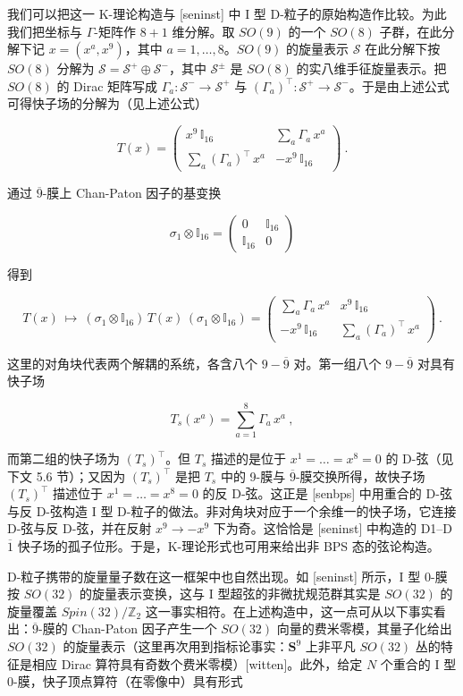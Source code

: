 \documentclass[11pt,a4paper]{ctexart}
\begin{document}
我们可以把这一 K-理论构造与 [seninst] 中 I 型 D-粒子的原始构造作比较。为此我们把坐标与 \(\Gamma\)-矩阵作 \(8+1\) 维分解。取 \(SO(9)\) 的一个 \(SO(8)\) 子群，在此分解下记 \(x=(x^a,x^9)\)，其中 \(a=1,\ldots, 8\)。\(SO(9)\) 的旋量表示 \({\mathcal S}\) 在此分解下按 \(SO(8)\) 分解为 \({\mathcal S}={\mathcal S}^+\oplus {\mathcal S}^-\)，其中 \({\mathcal S}^{\pm}\) 是 \(SO(8)\) 的实八维手征旋量表示。把 \(SO(8)\) 的 Dirac 矩阵写成 \(\Gamma_a: {\mathcal S}^-\rightarrow {\mathcal S}^+\) 与 \((\Gamma_a)^{\top}:{\mathcal S}^+\rightarrow{\mathcal S}^-\)。于是由上述公式可得快子场的分解为（见上述公式）

\[T(x)=\left( \begin{array}{cc}x^9\,{\mathbb{I}}_{16}& \sum_a\Gamma_a\,x^a\\
\sum_a(\Gamma_a)^{\top}\,x^a&-x^9\,{\mathbb{I}}_{16}
\end{array}\right)\ .\]

通过 \(\overline{9}\)-膜上 Chan-Paton 因子的基变换

\[\sigma_1\otimes{\mathbb{I}}_{16}=\left(
\begin{array}{cc}0&{\mathbb{I}}_{16}\\{\mathbb{I}}_{16}&0
\end{array}\right)\]

得到

\[T(x)~\longmapsto~(\sigma_1\otimes{\mathbb{I}}_{16})\,T(x)\,(\sigma_1\otimes{\mathbb{I}}_{16})=
\left( \begin{array}{cc} \sum_a\Gamma_a\,x^a & x^9\,{\mathbb{I}}_{16}\\ -x^9\,{\mathbb{I}}_{16}
&\sum_a(\Gamma_a)^{\top}\,x^a
\end{array}\right)\ .\]

这里的对角块代表两个解耦的系统，各含八个 \(9-\overline{9}\) 对。第一组八个 \(9-\overline{9}\) 对具有快子场

\[T_s(x^a)=\sum_{a=1}^8\Gamma_a\,x^a\ ,\]

而第二组的快子场为 \((T_s)^\top\)。但 \(T_s\) 描述的是位于 \(x^1=\ldots=x^8=0\) 的 D-弦（见下文 5.6 节）；又因为 \((T_s)^\top\) 是把 \(T_s\) 中的 9-膜与 \(\overline{9}\)-膜交换所得，故快子场 \((T_s)^\top\) 描述位于 \(x^1=\ldots=x^8=0\) 的反 D-弦。这正是 [senbps] 中用重合的 D-弦与反 D-弦构造 I 型 D-粒子的做法。非对角块对应于一个余维一的快子场，它连接 D-弦与反 D-弦，并在反射 \(x^9\rightarrow -x^9\) 下为奇。这恰恰是 [seninst] 中构造的 D1--D\(\overline{1}\) 快子场的孤子位形。于是，K-理论形式也可用来给出非 BPS 态的弦论构造。

D-粒子携带的旋量量子数在这一框架中也自然出现。如 [seninst] 所示，I 型 0-膜按 \(SO(32)\) 的旋量表示变换，这与 I 型超弦的非微扰规范群其实是 \(SO(32)\) 的旋量覆盖 \(Spin(32)/{\mathbb{Z}}_2\) 这一事实相符。在上述构造中，这一点可从以下事实看出：\(\overline{9}\)-膜的 Chan-Paton 因子产生一个 \(SO(32)\) 向量的费米零模，其量子化给出 \(SO(32)\) 的旋量表示（这里再次用到指标论事实：\({\mathbf S}^9\) 上非平凡 \(SO(32)\) 丛的特征是相应 Dirac 算符具有奇数个费米零模）[witten]。此外，给定 \(N\) 个重合的 I 型 0-膜，快子顶点算符（在零像中）具有形式
\end{document}
